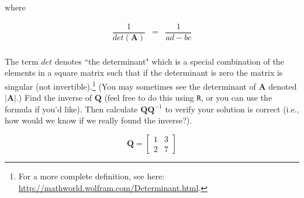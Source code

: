 \documentclass[12pt]{article}
\begin{document}
where

\begin{eqnarray*}
\dfrac{1}{det(\mathbf{A})}&=&\dfrac{1}{ad-bc}\\
\end{eqnarray*}

The term $det$ denotes ``the determinant" which is a special combination of the elements in a square matrix such that if the determinant is zero the matrix is singular (not invertible).\footnote{For a more complete definition, see here: \url{http://mathworld.wolfram.com/Determinant.html}.} (You may sometimes see the determinant of $\mathbf{A}$ denoted $|\mathbf{A}|$.) Find the inverse of $\mathbf{Q}$ (feel free to do this using \texttt{R}, or you can use the formula if you'd like). Then calculate $\mathbf{Q}\mathbf{Q}^{-1}$ to verify your solution is correct (i.e., how would we know if we really found the inverse?).



\begin{minipage}[t]{0.5\textwidth}
$$\mathbf{Q} = \left[\begin{array}{rr}
1 & 3\\
2 & 7 \end{array}\right]$$
\end{minipage}

\bigskip

%
\end{document}
